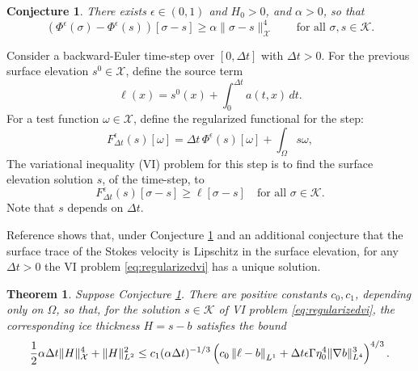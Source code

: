 \documentclass[12pt]{article}
\newtheorem{theorem}{Theorem}
\newtheorem{conjecture}{Conjecture}
\newcommand{\cK}{\ensuremath{\mathcal{K}}}
\newcommand{\cX}{\ensuremath{\mathcal{X}}}
\newcommand{\grad}{\ensuremath{\nabla}}
\newcommand{\eps}{\ensuremath{\epsilon}}
\begin{document}
\begin{conjecture} \label{conj:regcoercive}  There exists $\eps \in (0,1)$ and $H_0>0$, and $\alpha>0$, so that
\begin{equation}
\left(\Phi^\eps(\sigma) - \Phi^\eps(s)\right)[\sigma-s] \ge \alpha \|\sigma-s\|_{\cX}^4 \qquad \text{for all } \sigma,s\in\cK. \label{eq:regcoercive}
\end{equation}
\end{conjecture}

Consider a backward-Euler time-step over $[0,\Delta t]$ with $\Delta t > 0$.  For the previous surface elevation $s^0\in\cX$, define the source term
\begin{equation}
\ell(x) = s^0(x) + \int_{0}^{\Delta t} a(t,x)\,dt. \label{eq:be:source}
\end{equation}
For a test function $\omega\in\cX$, define the regularized functional for the step:
\begin{equation}
F^\eps_{\Delta t}(s)[\omega] = \Delta t\,\Phi^\eps(s)[\omega] + \int_\Omega s \omega, \label{eq:regularizedF}
\end{equation}
The variational inequality (VI) problem for this step is to find the surface elevation solution $s$, of the time-step, to
\begin{equation}
F^\eps_{\Delta t}(s)[\sigma-s] \ge \ell[\sigma-s] \quad \text{for all } \sigma \in \cK. \label{eq:regularizedvi}
\end{equation}
Note that $s$ depends on $\Delta t$.

Reference \cite{Bueler2025} shows that, under Conjecture \ref{conj:regcoercive} and an additional conjecture that the surface trace of the Stokes velocity is Lipschitz in the surface elevation, for any $\Delta t>0$ the VI problem \eqref{eq:regularizedvi} has a unique solution.

\begin{theorem}
Suppose Conjecture \ref{conj:regcoercive}.  There are positive constants $c_0,c_1$, depending only on $\Omega$, so that, for the solution $s\in\cK$ of VI problem \eqref{eq:regularizedvi}, the corresponding ice thickness $H=s-b$ satisfies the bound
\begin{equation}
\frac{1}{2} \alpha \Delta t \|H\|_{\cX}^4 + \|H\|_{L^2}^2 \le c_1 (\alpha \Delta t)^{-1/3} \left({\large \strut}c_0\left\|\ell-b\right\|_{L^1}  + \Delta t \eps \Gamma \eta_0^4 \|\grad b\|_{L^4}^3\right)^{4/3}. \label{eq:thebound}
\end{equation}
\end{theorem}
\end{document}

